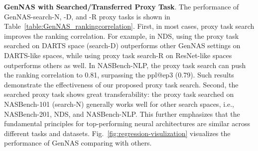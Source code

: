 \documentclass{article}
\begin{document}
\textbf{GenNAS with Searched/Transferred Proxy Task}.
The performance of GenNAS-search-N, -D, and -R proxy tasks is shown in Table~\ref{table:GenNAS_rankingcorrelation}.
First, in most cases, proxy task search improves the ranking correlation. For example, in NDS, using the proxy task searched on DARTS space (search-D) outperforms other GenNAS settings on DARTS-like spaces, while using proxy task search-R on ResNet-like spaces outperforms others as well. 
In NASBench-NLP, the proxy task search can push the ranking correlation to 0.81, surpassing the ppl@ep3 (0.79).
Such results demonstrate the effectiveness of our proposed proxy task search.
Second, the searched proxy task shows great transferability: the proxy task searched on NASBench-101 (search-N) generally works well for other search spaces, i.e., NASBench-201, NDS, and NASBench-NLP.
This further emphasizes that the fundamental principles for top-performing neural architectures are similar across different tasks and datasets.
Fig.~\ref{fig:regression-visulization} visualizes the performance of GenNAS comparing with others.
\end{document}
